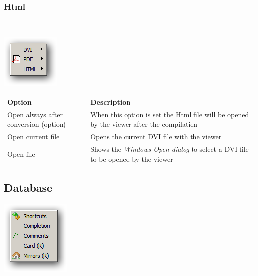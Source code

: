 \hypertarget{menu_tools_processing_viewer_html}{}
\subsubsection{Html}\\

\includegraphics[scale=0.50]{./res/menu_tools_processing_viewer.png}\\

\begin{scriptsize}\begin{tabularx}{\textwidth}{>{\hsize=0.7\hsize}X>{\hsize=0.7\hsize}X}\\
    \hline
    \textbf{Option} & \textbf{Description} \\
    \hline
    Open always after conversion (option) & When this option is set the Html file will be opened by the viewer after the compilation \\
    Open current file & Opens the current DVI file with the viewer \\
    Open file & Shows the \textit{Windows Open dialog} to select a DVI file to be opened by the viewer \\
    \hline
  \end{tabularx}\end{scriptsize}


\hypertarget{menu_tools_database}{}
\subsection{Database}

\includegraphics[scale=0.50]{./res/menu_tools_database.png}\\

